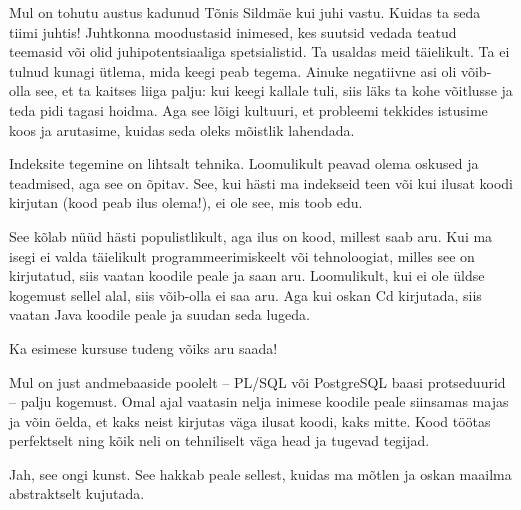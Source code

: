 Mul on tohutu austus kadunud Tõnis Sildmäe kui juhi 
vastu. Kuidas ta seda tiimi juhtis! Juhtkonna moodustasid inimesed, kes suutsid 
vedada teatud teemasid või olid juhipotentsiaaliga spetsialistid. Ta 
usaldas meid täielikult. Ta ei tulnud kunagi ütlema, mida keegi peab tegema. 
Ainuke negatiivne asi oli võib-olla see, et ta kaitses liiga palju: kui 
keegi kallale tuli, siis läks ta kohe võitlusse ja teda pidi tagasi 
hoidma. Aga see lõigi kultuuri, et probleemi tekkides istusime koos
ja arutasime, kuidas seda oleks mõistlik lahendada. 


Indeksite tegemine on lihtsalt tehnika. Loomulikult peavad olema 
oskused ja teadmised, aga see on õpitav. See, kui 
hästi ma indekseid teen või kui ilusat koodi kirjutan (kood peab ilus 
olema!), ei ole see, mis toob edu. 


See kõlab nüüd hästi populistlikult, aga ilus on kood, millest saab aru. Kui ma isegi ei valda täielikult programmeerimiskeelt või 
tehnoloogiat, milles see on kirjutatud, siis vaatan koodile peale ja saan aru. 
Loomulikult, kui ei ole üldse kogemust sellel alal, siis 
võib-olla ei saa aru. Aga kui oskan Cd kirjutada, siis vaatan Java koodile 
peale ja suudan seda lugeda. 


Ka esimese kursuse tudeng võiks aru saada!

Mul on just andmebaaside poolelt -- PL/SQL või PostgreSQL \mbox{baasi} protseduurid -- palju kogemust. Omal ajal vaatasin nelja inimese 
koodile peale siinsamas majas ja võin öelda, et kaks neist kirjutas väga ilusat koodi, kaks mitte. 
Kood töötas perfektselt ning kõik neli on tehniliselt väga head ja tugevad tegijad. 


Jah, see ongi kunst. See hakkab peale sellest, kuidas ma mõtlen ja 
oskan maailma abstraktselt kujutada. 


